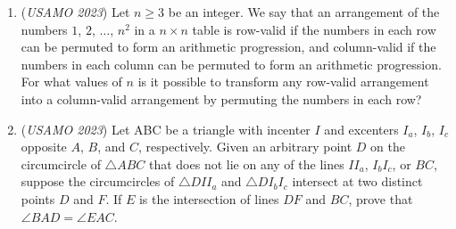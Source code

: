 \begin{enumerate}
 

	\item (\textit{USAMO 2023}) Let $n\geq3$ be an integer. We say that an arrangement of the numbers $1$, $2$, $\dots$, $n^2$ in a $n \times n$ table is row-valid if the numbers in each row can be permuted to form an arithmetic progression, and column-valid if the numbers in each column can be permuted to form an arithmetic progression. For what values of $n$ is it possible to transform any row-valid arrangement into a column-valid arrangement by permuting the numbers in each row?


 

	\item (\textit{USAMO 2023}) Let ABC be a triangle with incenter $I$ and excenters $I_a$, $I_b$, $I_c$ opposite $A$, $B$, and $C$, respectively. Given an arbitrary point $D$ on the circumcircle of $\triangle ABC$ that does not lie on any of the lines $II_a$, $I_bI_c$, or $BC$, suppose the circumcircles of $\triangle DII_a$ and $\triangle DI_bI_c$ intersect at two distinct points $D$ and $F$. If $E$ is the intersection of lines $DF$ and $BC$, prove that $\angle BAD = \angle EAC$.


 

\end{enumerate}